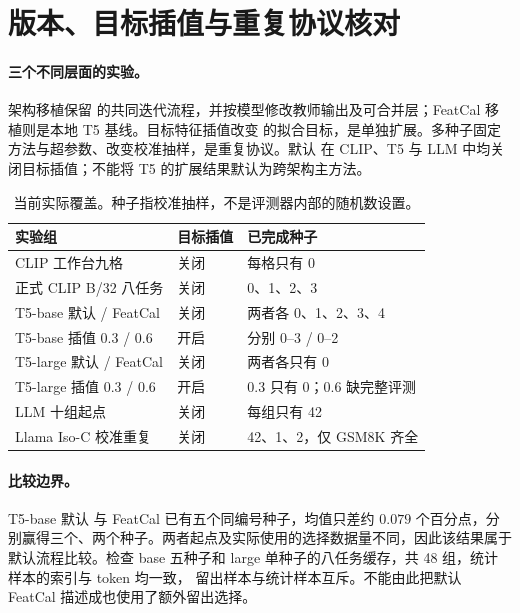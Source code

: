 \section{版本、目标插值与重复协议核对}
\label{app:alignment}

\paragraph{三个不同层面的实验。}
架构移植保留 \method{} 的共同迭代流程，并按模型修改教师输出及可合并层；FeatCal 移植则是本地 T5 基线。目标特征插值改变 \method{} 的拟合目标，是单独扩展。多种子固定方法与超参数、改变校准抽样，是重复协议。默认 \method{} 在 CLIP、T5 与 LLM 中均关闭目标插值；不能将 T5 的扩展结果默认为跨架构主方法。

\begin{table}[htbp]
\centering\small
\caption{当前实际覆盖。种子指校准抽样，不是评测器内部的随机数设置。}
\label{tab:protocol-coverage}
\setlength{\tabcolsep}{4pt}
\begin{tabular}{@{}lll@{}}
\toprule
实验组 & 目标插值 & 已完成种子 \\
\midrule
CLIP 工作台九格 & 关闭 & 每格只有 0 \\
正式 CLIP B/32 八任务 & 关闭 & 0、1、2、3 \\
T5-base 默认 \method{} / FeatCal & \method{} 关闭 & 两者各 0、1、2、3、4 \\
T5-base \method{} 插值 0.3 / 0.6 & 开启 & 分别 0--3 / 0--2 \\
T5-large 默认 \method{} / FeatCal & \method{} 关闭 & 两者各只有 0 \\
T5-large \method{} 插值 0.3 / 0.6 & 开启 & 0.3 只有 0；0.6 缺完整评测 \\
LLM 十组起点 & 关闭 & 每组只有 42 \\
Llama Iso-C 校准重复 & 关闭 & 42、1、2，仅 GSM8K 齐全 \\
\bottomrule
\end{tabular}
\end{table}



\paragraph{比较边界。}
T5-base 默认 \method{} 与 FeatCal 已有五个同编号种子，均值只差约 $0.079$ 个百分点，分别赢得三个、两个种子。两者起点及实际使用的选择数据量不同，因此该结果属于默认流程比较。检查 base 五种子和 large 单种子的八任务缓存，共 48 组，统计样本的索引与 token 均一致，\method{} 留出样本与统计样本互斥。不能由此把默认 FeatCal 描述成也使用了额外留出选择。

